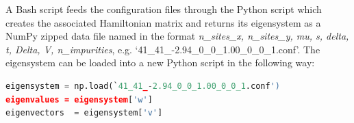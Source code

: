 A Bash script feeds the configuration files through the Python script which creates the associated Hamiltonian matrix and returns its eigensystem as a NumPy zipped data file named in the format \textit{n\_sites\_x, n\_sites\_y, mu, s, delta, t, Delta, V, n\_impurities}, e.g. `41\_41\_-2.94\_0\_0\_1.00\_0\_0\_1.conf'. The eigensystem can be loaded into a new Python script in the following way:
\begin{lstlisting}[language=Python]
eigensystem = np.load(`41_41_-2.94_0_0_1.00_0_0_1.conf')
eigenvalues = eigensystem['w']
eigenvectors  = eigensystem['v']
\end{lstlisting}
